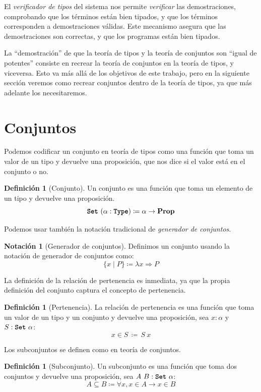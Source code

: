 \documentclass[
  a4paper, 
  10pt, 
  parskip=half, 
  toc=bibliography,
]{scrbook}
\theoremstyle{definition}
\theoremstyle{bolddef}
\newtheorem{definition}[theorem]{Definición}
\newtheorem{notation}[theorem]{Notación}
\newcommand{\tyfont}[1]{\texttt{\textbf{#1}}}
\renewcommand{\implies}{\rightarrow}
\renewcommand{\mapsto}{\Rightarrow}
\newcommand{\Prop}{\mathbf{Prop}}
\begin{document}
El \emph{verificador de tipos} del sistema nos permite \emph{verificar} las
demostraciones, comprobando que los términos están bien tipados, y que los términos
corresponden a demostraciones válidas. Este mecanismo asegura que las
demostraciones son correctas, y que los programas están bien tipados.

La \enquote{demostración} de que la teoría de tipos y la teoría de conjuntos son
\enquote{igual de potentes} consiste en recrear la teoría de conjuntos en la teoría de
tipos, y viceversa. Esto va más allá de los objetivos de este trabajo, pero
en la siguiente sección veremos como recrear conjuntos dentro
de la teoría de tipos, ya que más adelante los necesitaremos.

\section{Conjuntos}\label{sec:sets}

Podemos codificar un conjunto en teoría de tipos como una función que toma un
valor de un tipo y devuelve una proposición, que nos dice si el
valor está en el conjunto o no.

\begin{definition}[Conjunto]
  Un conjunto es una función que toma un elemento de un tipo y devuelve una
  proposición.
  \[
  \tyfont{Set} \ (\alpha: \tyfont{Type}) \coloneqq \alpha \to \Prop 
  \]
\end{definition}

Podemos usar también la notación tradicional de \emph{generador de conjuntos}.
\begin{notation}[Generador de conjuntos]
  Definimos un conjunto usando la notación de generador de conjuntos como:
  \[
  \{x \mid P\} \coloneqq \lambda x \mapsto P 
  \]
\end{notation}

La definición de la relación de pertenencia es inmediata, ya que la
propia definición del conjunto captura el concepto de pertenencia.
\begin{definition}[Pertenencia]
  La relación de pertenencia es una función que toma un valor de un tipo y un
  conjunto y devuelve una proposición, sea \(x: \alpha\) y \(S: \tyfont{Set} \ \alpha\):
  \[
  x \in S \,\coloneqq\, S \ x 
  \]
\end{definition}

Los subconjuntos se definen como en teoría de conjuntos.
\begin{definition}[Subconjunto]
  Un subconjunto es una función que toma dos conjuntos y devuelve una
  proposición, sea \(A \ B: \tyfont{Set} \ \alpha\):
  \[
  A \subseteq B \coloneqq \forall x, x \in A \implies x \in B 
  \]
\end{definition}
\end{document}
